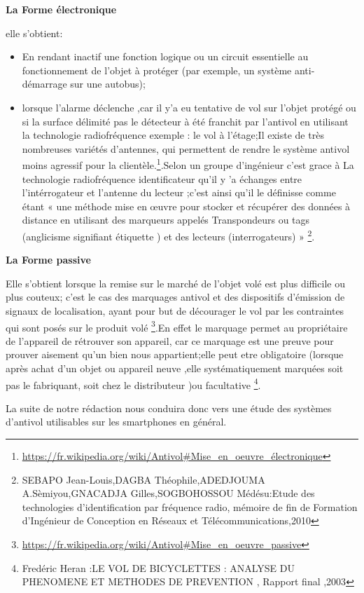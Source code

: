 \documentclass[a4paper, 12pt]{article}
\begin{document}
\textbf{La Forme électronique}

elle s'obtient:

\begin{itemize}
\item En rendant inactif une fonction logique ou un circuit essentielle au fonctionnement de l'objet à protéger (par exemple, un système anti-démarrage sur une autobus);
\item lorsque l'alarme déclenche ,car il y'a eu tentative de vol sur l'objet protégé ou si la surface délimité pas le détecteur à été franchit par l'antivol en utilisant la technologie radiofréquence exemple : le vol à l'étage;Il existe de très nombreuses variétés d'antennes, qui permettent de rendre le système antivol moins agressif pour la clientèle.\footnote{\url{https://fr.wikipedia.org/wiki/Antivol#Mise_en_oeuvre_électronique}}.Selon un groupe d'ingénieur c'est grace à La technologie radiofréquence identificateur qu'il y 'a échanges entre l'intérrogateur et l'antenne du lecteur ;c'est ainsi qu'il le définisse comme étant « une méthode mise en œuvre pour stocker et récupérer des données à distance en utilisant des marqueurs appelés Transpondeurs ou tags (anglicisme signifiant  étiquette ) et des lecteurs (interrogateurs) » \footnote{SEBAPO Jean-Louis,DAGBA Théophile,ADEDJOUMA A.Sèmiyou,GNACADJA Gilles,SOGBOHOSSOU Médésu:Etude des technologies d’identification par fréquence radio, mémoire de fin de Formation d’Ingénieur de Conception en Réseaux et Télécommunications,2010}.
\end{itemize}

\textbf{La Forme passive}

Elle s'obtient lorsque la remise sur le marché de l'objet volé est plus difficile ou plus couteux; c'est le cas des marquages antivol et des dispositifs d'émission de signaux de localisation, ayant pour but de décourager le vol par les contraintes qui sont posés sur le produit volé \footnote{\url{https://fr.wikipedia.org/wiki/Antivol#Mise_en_oeuvre_passive}}.En effet le marquage permet au propriétaire de l'appareil de rétrouver son appareil, car ce marquage est une preuve pour prouver aisement qu'un bien nous appartient;elle peut etre obligatoire (lorsque après achat d'un objet ou appareil neuve ,elle systématiquement marquées soit pas le fabriquant, soit chez le distributeur )ou facultative  \footnote{Fredéric Heran :LE VOL DE BICYCLETTES : ANALYSE DU PHENOMENE ET METHODES DE PREVENTION , Rapport final ,2003}. 


La suite de notre rédaction nous conduira donc vers une
étude des systèmes d’antivol utilisables sur les smartphones en général.
\newline
\newline
\end{document}
